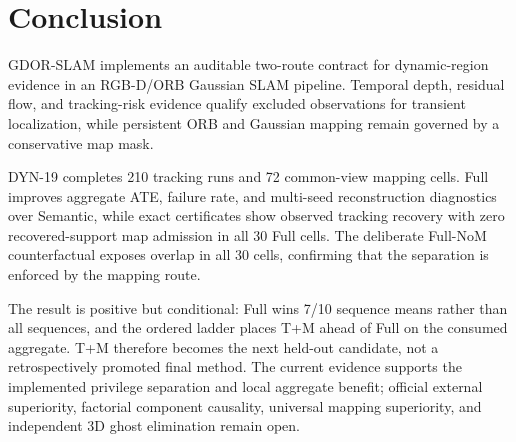 \section{Conclusion}

GDOR-SLAM implements an auditable two-route contract for dynamic-region evidence in an RGB-D/ORB Gaussian SLAM pipeline.
Temporal depth, residual flow, and tracking-risk evidence qualify excluded observations for transient localization, while persistent ORB and Gaussian mapping remain governed by a conservative map mask.

DYN-19 completes 210 tracking runs and 72 common-view mapping cells.
Full improves aggregate ATE, failure rate, and multi-seed reconstruction diagnostics over Semantic, while exact certificates show observed tracking recovery with zero recovered-support map admission in all 30 Full cells.
The deliberate Full-NoM counterfactual exposes overlap in all 30 cells, confirming that the separation is enforced by the mapping route.

The result is positive but conditional: Full wins 7/10 sequence means rather than all sequences, and the ordered ladder places T+M ahead of Full on the consumed aggregate.
T+M therefore becomes the next held-out candidate, not a retrospectively promoted final method.
The current evidence supports the implemented privilege separation and local aggregate benefit; official external superiority, factorial component causality, universal mapping superiority, and independent 3D ghost elimination remain open.

